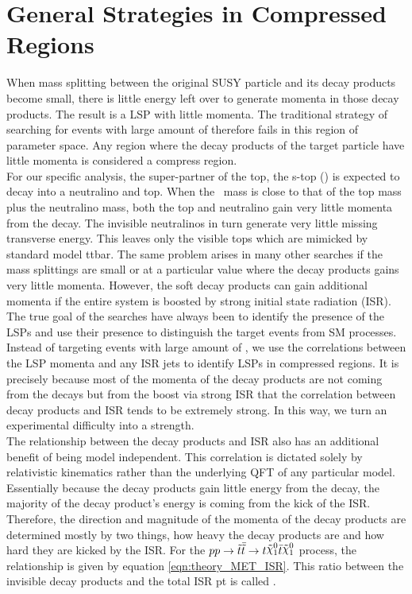\section{General Strategies in Compressed Regions}
\indent When mass splitting between the original SUSY particle and its decay products become small, there is little energy left over to generate momenta in those decay products.  The result is a LSP with little momenta.  The traditional strategy of searching for events with large amount of \MET therefore fails in this region of parameter space.  Any region where the decay products of the target particle have little momenta is considered a compress region.  ~\\
\indent  For our specific analysis, the super-partner of the top, the s-top (\stop) is expected to decay into a neutralino and top.  When the \stop~mass is close to that of the top mass plus the neutralino mass, both the top and neutralino gain very little momenta from the decay.  The invisible neutralinos in turn generate very little missing transverse energy.  This leaves only the visible tops which are mimicked by standard model ttbar.  The same problem arises in many other searches if the mass splittings are small or at a particular value where the decay products gains very little momenta.  However, the soft decay products can gain additional momenta if the entire system is boosted by strong initial state radiation (ISR). \\
\indent The true goal of the searches have always been to identify the presence of the LSPs and use their presence to distinguish the target events from SM processes.  Instead of targeting events with large amount of \MET, we use the correlations between the LSP momenta and any ISR jets to identify LSPs in compressed regions.  It is precisely because most of the momenta of the decay products are not coming from the decays but from the boost via strong ISR that the correlation between decay products and ISR tends to be extremely strong.  In this way, we turn an experimental difficulty into a strength.  \\
\indent The relationship between the decay products and ISR also has an additional benefit of being model independent.  This correlation is dictated solely by relativistic kinematics rather than the underlying QFT of any particular model.  Essentially because the decay products gain little energy from the decay, the majority of the decay product's energy is coming from the kick of the ISR.  Therefore, the direction and magnitude of the momenta of the decay products are determined mostly by two things, how heavy the decay products are and how hard they are kicked by the ISR. For the $p p \rightarrow \antibar{\stop} \rightarrow t\ninoone\tbar\ninoone$ process, the relationship is given by equation \ref{eqn:theory_MET_ISR}. This ratio between the invisible decay products and the total ISR pt is called \RISR. \\

